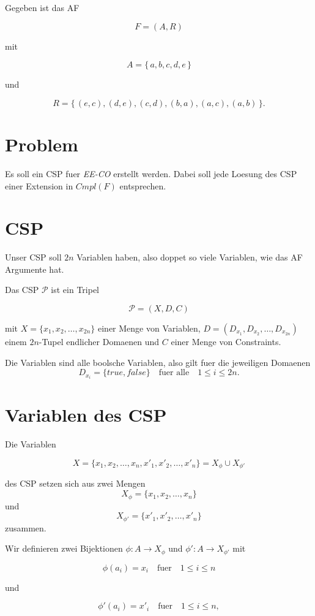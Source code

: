 Gegeben ist das AF

\[ F = (A,R) \]

mit

\[ A = \{\,a,b,c,d,e\,\} \]

und

\[ R = \{\,(e,c),(d,e),(c,d),(b,a),(a,c),(a,b)\,\} .\]

\section{Problem}\label{problem}

Es soll ein CSP fuer \emph{EE-CO} erstellt werden. Dabei soll jede
Loesung des CSP einer Extension in $Cmpl(F)$ entsprechen.

\section{CSP}\label{csp}

Unser CSP soll $2n$ Variablen haben, also doppet so viele Variablen, wie
das AF Argumente hat.

Das CSP $\mathscr{P}$ ist ein Tripel

\[ \mathscr{P} = (X,D,C) \]

mit $X = \{x_1,x_2,\dots,x_{2n}\} $ einer Menge von Variablen,
$D = (D_{x_1},D_{x_2},\dots,D_{x_{2n}}) $ einem $2n$-Tupel endlicher
Domaenen und $C$ einer Menge von Constraints.

Die Variablen sind alle boolsche Variablen, also gilt fuer die
jeweiligen Domaenen
\[ D_{x_i} = \{true, false\} \quad\text{fuer alle}\quad 1\leq i \leq 2n .\]

\section{Variablen des CSP}\label{variablen-des-csp}

Die Variablen

\[ X  = \{x_1,x_2,\dots,x_n,x'_1,x'_2,\dots,x'_n\} = X_{\phi} \cup X_{\phi'} \]

des CSP setzen sich aus zwei Mengen \[X_{\phi} = \{x_1,x_2,\dots,x_n\}
\] und \[X_{\phi'} = \{x'_1,x'_2,\dots,x'_n\} \] zusammen.

Wir definieren zwei Bijektionen $\phi \colon A \to X_{\phi}$ und
$\phi' \colon A \to X_{\phi'}$ mit

\[ \phi(a_i) = x_i \quad \text{fuer} \quad 1 \leq i \leq  n \]

und

\[ \phi'(a_i) = x'_i \quad \text{fuer} \quad 1 \leq i \leq  n,\]

